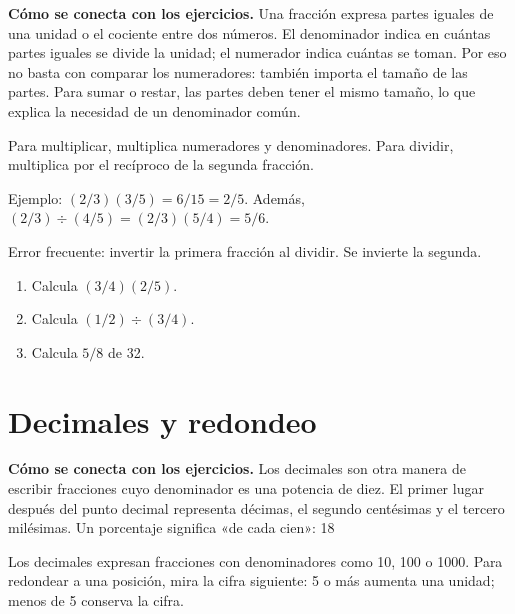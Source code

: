 \documentclass[10pt,oneside,openany]{book}
\begin{document}
\textbf{Cómo se conecta con los ejercicios.} Una fracción expresa partes iguales de una unidad o el cociente entre dos números. El denominador indica en cuántas partes iguales se divide la unidad; el numerador indica cuántas se toman. Por eso no basta con comparar los numeradores: también importa el tamaño de las partes. Para sumar o restar, las partes deben tener el mismo tamaño, lo que explica la necesidad de un denominador común.

Para multiplicar, multiplica numeradores y denominadores. Para dividir, multiplica por el recíproco de la segunda fracción.

\begin{ejemplo}
Ejemplo: $(2/3)(3/5)=6/15=2/5$. Además, $(2/3)\div(4/5)=(2/3)(5/4)=5/6$.
\end{ejemplo}

\begin{ojo}
Error frecuente: invertir la primera fracción al dividir. Se invierte la segunda.
\end{ojo}

\begin{practica}

\begin{enumerate}

\item Calcula $(3/4)(2/5)$.

\item Calcula $(1/2)\div(3/4)$.

\item Calcula $5/8$ de 32.

\end{enumerate}

\end{practica}



\section{Decimales y redondeo}

\textbf{Cómo se conecta con los ejercicios.} Los decimales son otra manera de escribir fracciones cuyo denominador es una potencia de diez. El primer lugar después del punto decimal representa décimas, el segundo centésimas y el tercero milésimas. Un porcentaje significa «de cada cien»: 18 %

Los decimales expresan fracciones con denominadores como 10, 100 o 1000. Para redondear a una posición, mira la cifra siguiente: 5 o más aumenta una unidad; menos de 5 conserva la cifra.
\end{document}
